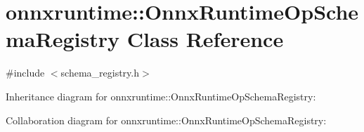 \hypertarget{classonnxruntime_1_1OnnxRuntimeOpSchemaRegistry}{}\section{onnxruntime\+:\+:Onnx\+Runtime\+Op\+Schema\+Registry Class Reference}
\label{classonnxruntime_1_1OnnxRuntimeOpSchemaRegistry}


{\ttfamily \#include $<$schema\+\_\+registry.\+h$>$}



Inheritance diagram for onnxruntime\+:\+:Onnx\+Runtime\+Op\+Schema\+Registry\+:


Collaboration diagram for onnxruntime\+:\+:Onnx\+Runtime\+Op\+Schema\+Registry\+:

